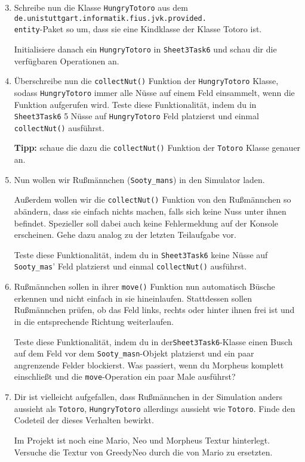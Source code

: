 \begin{enumerate}\setcounter{enumi}{2}
\item Schreibe nun die Klasse \lstinline{HungryTotoro} aus dem \texttt{de.unistuttgart.informatik.fius.jvk.provided.}\\\texttt{entity}-Paket so um, dass sie eine Kindklasse der Klasse Totoro ist.

Initialisiere danach ein \lstinline{HungryTotoro} in \lstinline{Sheet3Task6} und schau dir die verfügbaren Operationen an.

\item Überschreibe nun die \lstinline{collectNut()} Funktion der \lstinline{HungryTotoro} Klasse, sodass \lstinline{HungryTotoro} immer alle Nüsse auf einem Feld einsammelt, wenn die Funktion aufgerufen wird.
Teste diese Funktionalität, indem du in \lstinline{Sheet3Task6} 5 Nüsse auf \lstinline{HungryTotoro} Feld platzierst und einmal \lstinline{collectNut()} ausführst.

\textbf{Tipp:} schaue die dazu die \lstinline{collectNut()} Funktion der \lstinline{Totoro} Klasse genauer an.

\item Nun wollen wir Rußmännchen (\lstinline{Sooty_mans}) in den Simulator laden.

Außerdem wollen wir die \lstinline{collectNut()} Funktion von den Rußmännchen so abändern, dass sie einfach nichts machen, falls sich keine Nuss unter ihnen befindet.
Spezieller soll dabei auch keine Fehlermeldung auf der Konsole erscheinen.
Gehe dazu analog zu der letzten Teilaufgabe vor.

Teste diese Funktionalität, indem du in \lstinline{Sheet3Task6} keine Nüsse auf \lstinline{Sooty_mas}' Feld platzierst und einmal \lstinline{collectNut()} ausführst.

\item Rußmännchen sollen in ihrer \lstinline{move()} Funktion nun automatisch Büsche erkennen und nicht einfach in sie hineinlaufen.
Stattdessen sollen Rußmännchen prüfen, ob das Feld links, rechts oder hinter ihnen frei ist und in die entsprechende Richtung weiterlaufen.

Teste diese Funktionalität, indem du in der\lstinline{Sheet3Task6}-Klasse einen Busch auf dem Feld vor dem \lstinline{Sooty_masn}-Objekt platzierst und ein paar angrenzende Felder blockierst.
Was passiert, wenn du Morpheus komplett einschließt und die \lstinline{move}-Operation ein paar Male ausführst?

\item \optional Dir ist vielleicht aufgefallen, dass Rußmännchen in der Simulation anders aussieht als \lstinline{Totoro}, \lstinline{HungryTotoro} allerdings aussieht wie \lstinline{Totoro}.
Finde den Codeteil der dieses Verhalten bewirkt.

Im Projekt ist noch eine Mario, Neo und Morpheus Textur hinterlegt.
Versuche die Textur von GreedyNeo durch die von Mario zu ersetzten.

\end{enumerate}
